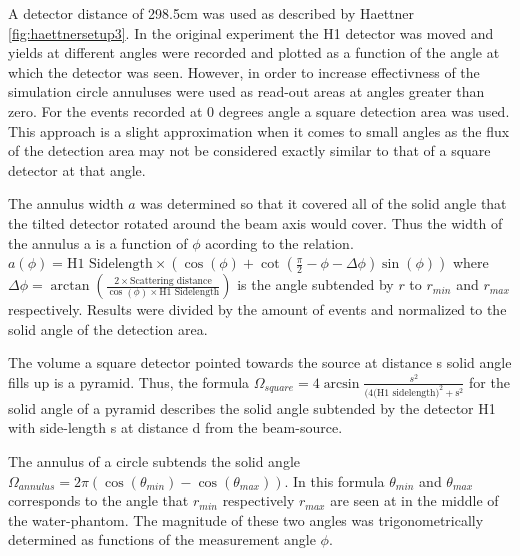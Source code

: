 A detector distance of 298.5cm was used as described by Haettner \ref{fig:haettnersetup3}. In the original experiment the H1 detector was moved and yields at different angles were recorded and plotted as a function of the angle at which the detector was seen. However, in order to increase effectivness of the simulation circle annuluses were used as read-out areas at angles greater than zero. For the events recorded at 0 degrees angle a square detection area was used. This approach is a slight approximation when it comes to small angles as the flux of the detection area may not be considered exactly similar to that of a square detector at that angle.

The annulus width $a$ was determined so that it covered all of the solid angle that the tilted detector rotated around the beam axis would cover. Thus the width of the annulus a is a function of $\phi$ acording to the relation. $a(\phi) = \text{H1 Sidelength} \times (\cos(\phi)+ \cot(\frac{\pi}{2} - \phi - \Delta\phi)\sin(\phi))$ where $\Delta\phi = \arctan(\frac{2 \times \text{Scattering distance}}{\cos(\phi) \times \text{H1 Sidelength}})$ is the angle subtended by $r$ to $r_{min}$ and $r_{max}$ respectively.
Results were divided by the amount of events and normalized to the solid angle of the detection area.

The volume a square detector pointed towards the source at distance s solid angle fills up is a pyramid. Thus, the formula $\Omega_{square} = 4 \arcsin{\frac{s^2}{(4\text{(H1 sidelength)}^2+\text{s}^2}}$ for the solid angle of a pyramid describes the solid angle subtended by the detector H1 with side-length s at distance d from the beam-source.

The annulus of a circle subtends the solid angle $\Omega_{annulus} = 2 \pi (\cos(\theta_{min}) - \cos(\theta_{max}))$. In this formula $\theta_{min}$ and $\theta_{max}$ corresponds to the angle that $r_{min}$ respectively $r_{max}$ are seen at in the middle of the water-phantom. The magnitude of these two angles was trigonometrically determined as functions of the measurement angle $\phi$.



